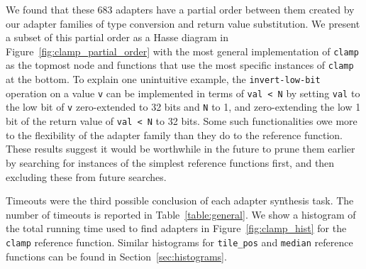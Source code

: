%
We found that these 683 adapters have a partial order between them created by our adapter families of type conversion and return value substitution.
%
We present a subset of this partial order as a Hasse diagram in
Figure~\ref{fig:clamp_partial_order} with the most general
implementation of {\tt clamp} as the topmost node and functions that use
the most
specific instances of {\tt clamp} at the bottom.
%
To explain one unintuitive example, the {\tt invert-low-bit} operation on a value {\tt v} can be implemented in terms of {\tt val < N} by setting {\tt val} to the low bit of {\tt v} zero-extended to 32 bits and {\tt N} to 1, and zero-extending the low 1 bit of the return value of {\tt val < N} to 32 bits.
%
Some such functionalities owe more to the flexibility of the adapter
family than they do to the reference function.
%
These results suggest it would be worthwhile in the future to prune
them earlier by searching for instances of the simplest reference
functions first, and then excluding these from future searches.

Timeouts were the third possible conclusion of each adapter synthesis task.
The number of timeouts is reported in Table~\ref{table:general}.
%
We show a histogram of the total running time used to find adapters in Figure~\ref{fig:clamp_hist} for the {\tt clamp} reference function.
%
Similar histograms for {\tt tile\_pos} and {\tt median} reference
functions can be found in Section~\ref{sec:histograms}.
%

%
